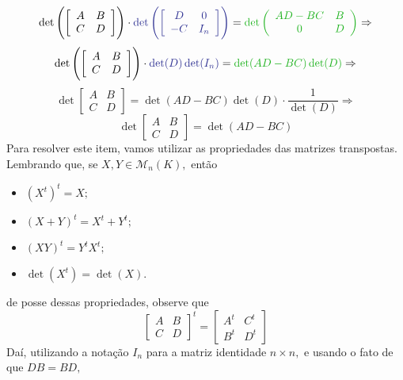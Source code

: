 \documentclass[11pt,a4paper]{article}
\begin{document}
{{       \[\det \left(\left[ \begin{array}{cc} A & B \\ C & D \end{array} \right]\right)  \cdot \textcolor{Blue}{\det \left( \left[ \begin{array}{cc} D & 0 \\ -C & I_n \end{array} \right] \right)} = \textcolor{Verde}{ \det \left( \begin{array}{cc} AD - BC & B \\ 0 & D \end{array} \right)} \Rightarrow \]
       \[\det \left(\left[ \begin{array}{cc} A & B \\ C & D \end{array} \right]\right)  \cdot \textcolor{Blue}{\det(D) \det(I_n)} = \textcolor{Verde}{ \det (AD - BC) \det(D)}\Rightarrow \]
       \[   \det \left[ \begin{array}{cc} A & B \\ C & D \end{array} \right]= \det (AD - BC) \det(D)\cdot \frac{1}{\det(D)} \Rightarrow  \]
       \[  \boxed{\det \left[ \begin{array}{cc} A & B \\ C & D \end{array} \right] = \det (AD - BC)  } \]
           \task[\pers{c}] Para resolver este item, vamos utilizar as propriedades das matrizes transpostas. Lembrando que, se $X, Y \in \mathcal{M}_n(K),$ então
           \begin{itemize}
           \item $(X^t)^t = X;$
               \item $(X + Y)^t = X^t + Y^t;$
               \item $(XY)^t = Y^tX^t;$
               \item $\det(X^t) = \det(X).$
           \end{itemize}
           de posse dessas propriedades, observe que
           \[
            \left[ \begin{array}{cc} A & B \\ C & D \end{array} \right]^t =   \left[ \begin{array}{cc} A^t & C^t \\ B^t & D^t \end{array} \right]
           \]
           Daí, utilizando a notação $I_n$ para a matriz identidade $n \times n,$ e usando o fato de que $DB = BD,$
}}
\end{document}

